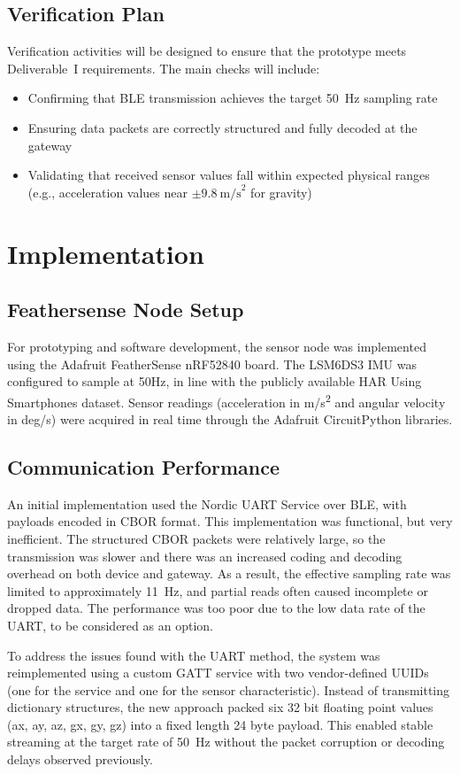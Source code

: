 \documentclass[conference]{IEEEtran}
\begin{document}
\subsection{Verification Plan}
Verification activities will be designed to ensure that the prototype meets Deliverable~I requirements. The main checks will include:
\begin{itemize}
	\item Confirming that BLE transmission achieves the target 50~Hz sampling rate
	\item Ensuring data packets are correctly structured and fully decoded at the gateway
	\item Validating that received sensor values fall within expected physical ranges (e.g., acceleration values near $\pm 9.8~\text{m/s}^2$ for gravity)
\end{itemize}

\section{Implementation}
\subsection{Feathersense Node Setup}
For prototyping and software development, the sensor node was implemented using the Adafruit FeatherSense nRF52840 board. The LSM6DS3 IMU was configured to sample at 50Hz, in line with the publicly available HAR Using Smartphones dataset. Sensor readings (acceleration in m/s\textsuperscript{2} and angular velocity in deg/s) were acquired in real time through the Adafruit CircuitPython libraries. 

\subsection{Communication Performance}
An initial implementation used the Nordic UART Service over BLE, with payloads encoded in CBOR format. This implementation was functional, but very inefficient. The structured CBOR packets were relatively large, so the transmission was slower and there was an increased coding and decoding overhead on both device and gateway. As a result, the effective sampling rate was limited to approximately 11~Hz, and partial reads often caused incomplete or dropped data. The performance was too poor due to the low data rate of the UART, to be considered as an option.

To address the issues found with the UART method, the system was reimplemented using a custom GATT service with two vendor-defined UUIDs (one for the service and one for the sensor characteristic). Instead of transmitting dictionary structures, the new approach packed six 32 bit floating point values (ax, ay, az, gx, gy, gz) into a fixed length 24 byte payload. This enabled stable streaming at the target rate of 50~Hz without the packet corruption or decoding delays observed previously.
\end{document}
